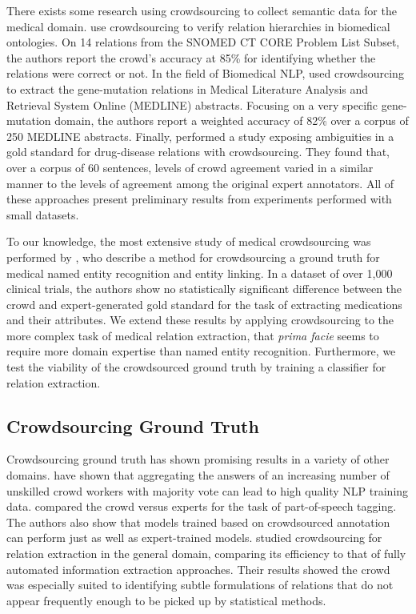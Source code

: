 There exists some research using crowdsourcing to collect semantic data for the medical domain. \cite{mortensen2013crowdsourcing} use crowdsourcing to verify relation hierarchies in biomedical ontologies. On 14 relations from the SNOMED CT CORE Problem List Subset, the authors report the crowd's accuracy at 85\% for identifying whether the relations were correct or not. In the field of Biomedical NLP, \cite{burger2012validating} used crowdsourcing to extract the gene-mutation relations in Medical Literature Analysis and Retrieval System Online (MEDLINE) abstracts. Focusing on a very specific gene-mutation domain, the authors report a weighted accuracy of 82\% over a corpus of 250 MEDLINE abstracts. Finally, \cite{li2015exposing} performed a study exposing ambiguities in a gold standard for drug-disease relations with crowdsourcing. They found that, over a corpus of 60 sentences, levels  of  crowd agreement varied in a similar manner to the levels of agreement  among  the  original  expert  annotators. All of these approaches present preliminary results from experiments performed with small datasets.

To our knowledge, the most extensive study of medical crowdsourcing was performed by \cite{zhai2013web}, who describe a method for crowdsourcing a ground truth for medical named entity recognition and entity linking. In a dataset of over 1,000 clinical trials, the authors show no statistically significant difference between the crowd and expert-generated gold standard for the task of extracting medications and their attributes. We extend these results by applying crowdsourcing to the more complex task of medical relation extraction, that \textit{prima facie} seems to require more domain expertise than named entity recognition. Furthermore, we test the viability of the crowdsourced ground truth by training a classifier for relation extraction.

\subsection{Crowdsourcing Ground Truth}

Crowdsourcing ground truth has shown promising results in a variety of other domains. \cite{Snow2008} have shown that aggregating the answers of an increasing number of unskilled crowd workers with majority vote can lead to high quality NLP training data. \cite{hovy-plank-sogaard:2014:P14-2} compared the crowd versus experts for the task of part-of-speech tagging.  The authors also show that models trained based on crowdsourced annotation can perform just as well as expert-trained models. \cite{kondreddi2014combining} studied crowdsourcing for relation extraction in the general domain, comparing its efficiency to that of fully automated information extraction approaches.  Their results showed the crowd was especially suited to identifying subtle formulations of relations that do not appear frequently enough to be picked up by statistical methods.


